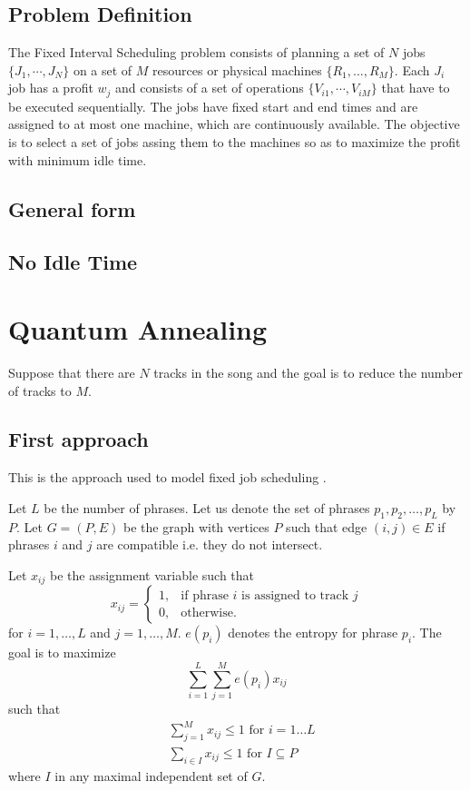 \documentclass[11pt,a4paper]{article}
\begin{document}
\subsection{Problem Definition}
The Fixed Interval Scheduling problem consists of planning a set of $N$ jobs $\{J_1, \cdots,J_N \}$ on a set of $M$ resources or physical machines $\{R_1, ...,R_M \}$. Each $J_i$ job has a  profit $w_j$ and consists of a set of operations $\{V_{i1}, \cdots , V_{iM} \}$ that have to be executed sequentially. The jobs have fixed start and end times and are assigned to at most one machine, which are continuously available. The objective is to select a set of jobs assing them to the machines so as to maximize the profit with minimum idle time. 
\subsection{General form}
\subsection{No Idle Time}

\section{Quantum Annealing}



Suppose that there are $ N $ tracks in the song and the goal is to reduce the number of tracks to $ M $.
\subsection{First approach}

This is the approach used to model fixed job scheduling \cite{arkin1987scheduling, barcia2005k}. 

Let $L $ be the number of phrases. Let us denote the set of phrases $ p_1,p_2,\dots,p_L $ by $ P $. Let $ G=(P,E) $ be the graph with vertices $ P $ such that edge $(i,j) \in E$ if phrases $ i $ and $ j $ are compatible i.e. they do not intersect.

Let $ x_{ij} $ be the assignment variable such that
\begin{equation}
x_{ij} =   \begin{cases}%
1,      & \text{if phrase $i$ is assigned to track $j$}\\
0, & \text{otherwise.}
\end{cases}
\end{equation}
 for $ i = 1, \dots ,L $ and $ j=1, \dots ,M  $. $ e(p_i) $ denotes the entropy for phrase $ p_i $. The goal is to maximize 
\begin{equation}
\sum_{i=1}^L \sum_{j=1}^M e(p_{i})x_{ij}	
 \end{equation}
 such that
 \begin{align}
 &\sum_{j=1}^M x_{ij} \leq 1 \mbox{ for }i=1\dots L \\
 &\sum_{i \in I} x_{ij} \leq 1 \mbox{ for } I \subseteq P
 \end{align}
 where $ I $ in any maximal independent set of $ G $.
\end{document}
